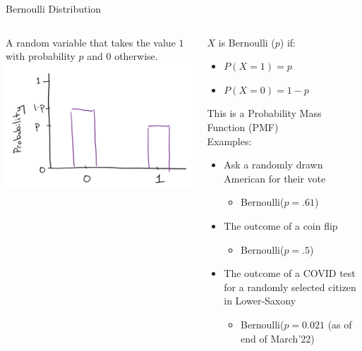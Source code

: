 \documentclass[aspectratio=169]{../latex_main/tntbeamer}  %
\begin{document}
	
	\begin{frame}[c]{Bernoulli Distribution}
	    \begin{columns}
	        \begin{column}{.3\textwidth}
	             A random variable that takes the value $1$ with probability $p$ and $0$ otherwise.\\

	                \centering
	                \includegraphics[scale=.6]{Bild17}
	                
	        \end{column}
	        
	        
	        \begin{column}{.52\textwidth}
	          $X$ is Bernoulli ($p$) if:\\
	          \begin{itemize}
	              \item $P(X = 1) = p$
	              \item $P(X = 0) = 1-p$
	          \end{itemize}
              This is a Probability Mass Function (PMF)\\
              Examples:
              \begin{itemize}
                  \item Ask a randomly drawn American for their vote
                  \begin{itemize}
                      \item Bernoulli($p = .61$)
                  \end{itemize}
                  \item The outcome of a coin flip
                  \begin{itemize}
                      \item Bernoulli($p = .5$)
                  \end{itemize}
                  \item The outcome of a COVID test for a randomly selected citizen in Lower-Saxony
                  \begin{itemize}
                      \item Bernoulli($p = 0.021$ (as of end of March'22)
                  \end{itemize}
              \end{itemize}
                

\end{column}
\end{columns}
\end{frame}
\end{document}
